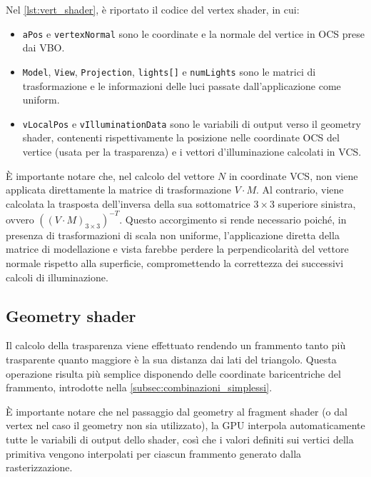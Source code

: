 Nel \cref{lst:vert_shader}, è riportato il codice del vertex shader, in cui:
\begin{itemize}
    \item \texttt{aPos} e \texttt{vertexNormal} sono le coordinate e la normale del vertice in OCS prese dai VBO.
    \item \texttt{Model}, \texttt{View}, \texttt{Projection}, \texttt{lights[]} e \texttt{numLights} sono le matrici di trasformazione e le informazioni delle luci passate dall'applicazione come uniform.
    \item \texttt{vLocalPos} e \texttt{vIlluminationData} sono le variabili di  output verso il geometry shader, contenenti rispettivamente la posizione nelle coordinate OCS del vertice (usata per la trasparenza) e i vettori d'illuminazione calcolati in VCS.
\end{itemize}

È importante notare che, nel calcolo del vettore $N$ in coordinate VCS, non viene applicata direttamente la matrice di trasformazione $V \cdot M$.
Al contrario, viene calcolata la trasposta dell'inversa della sua sottomatrice $3\times3$ superiore sinistra, ovvero $\left((V \cdot M)_{3\times3}\right)^{-T}$.
Questo accorgimento si rende necessario poiché, in presenza di trasformazioni di scala non uniforme, l'applicazione diretta della matrice di modellazione e vista farebbe perdere la perpendicolarità del vettore normale rispetto alla superficie, compromettendo la correttezza dei successivi calcoli di illuminazione.



\subsection{Geometry shader}
Il calcolo della trasparenza viene effettuato rendendo un frammento tanto più trasparente quanto maggiore è la sua distanza dai lati del triangolo.
Questa operazione risulta più semplice disponendo delle coordinate baricentriche del frammento, introdotte nella \cref{subsec:combinazioni_simplessi}.

È importante notare che nel passaggio dal geometry al fragment shader (o dal vertex nel caso il geometry non sia utilizzato), la GPU interpola automaticamente tutte le variabili di output dello shader, così che i valori definiti sui vertici della primitiva vengono interpolati per ciascun frammento generato dalla rasterizzazione.

